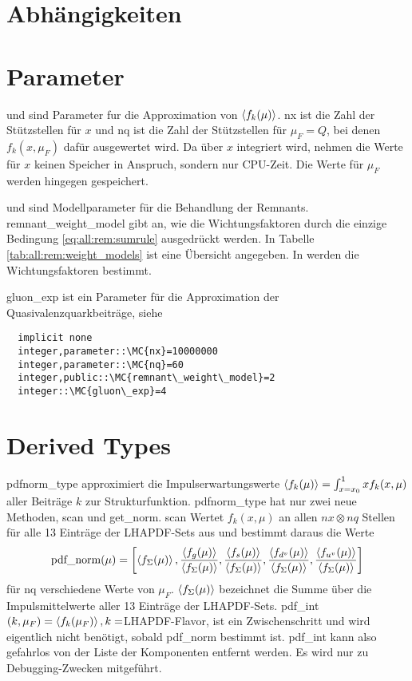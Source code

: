 \section{Abhängigkeiten}

\section{Parameter}
 und  sind Parameter fur die Approximation von $\left<f_k(\mu)\right>$. nx ist die Zahl der Stützstellen für $x$ und nq ist die Zahl der Stützstellen für $\mu_F=Q$, bei denen $f_k(x,\mu_F)$ dafür ausgewertet wird. Da über $x$ integriert wird, nehmen die Werte für $x$ keinen Speicher in Anspruch, sondern nur CPU-Zeit. Die Werte für $\mu_F$ werden hingegen gespeichert.

 und  sind Modellparameter für die Behandlung der Remnants. remnant\_weight\_model gibt an, wie die Wichtungsfaktoren durch die einzige Bedingung \eqref{eq:all:rem:sumrule} ausgedrückt werden. In Tabelle \ref{tab:all:rem:weight_models} ist eine Übersicht angegeben. In  werden die Wichtungsfaktoren bestimmt.

gluon\_exp ist ein Parameter für die Approximation der Quasivalenzquarkbeiträge, siehe 
\begin{Verbatim}
  implicit none
  integer,parameter::\MC{nx}=10000000
  integer,parameter::\MC{nq}=60
  integer,public::\MC{remnant\_weight\_model}=2
  integer::\MC{gluon\_exp}=4
\end{Verbatim}

\section{Derived Types}
pdfnorm\_type approximiert die Impulserwartungswerte $\left<f_k(\mu)\right>=\int_{x=x_0}^{1}xf_k(x,\mu)$ aller Beiträge $k$ zur Strukturfunktion. pdfnorm\_type hat nur zwei neue Methoden, scan und get\_norm. scan Wertet $f_k(x,\mu)$ an allen $nx\otimes nq$ Stellen für alle 13 Einträge der LHAPDF-Sets aus und bestimmt daraus die Werte
\begin{equation}
  \text{pdf\_norm}(\mu)=\left[\left<f_\Sigma(\mu)\right>,\frac{\left<f_g(\mu)\right>}{\left<f_\Sigma(\mu)\right>},\frac{\left<f_{s}(\mu)\right>}{\left<f_\Sigma(\mu)\right>},\frac{\left<f_{d^v}(\mu)\right>}{\left<f_\Sigma(\mu)\right>},\frac{\left<f_{u^v}(\mu)\right>}{\left<f_\Sigma(\mu)\right>}\right]
\end{equation}
für nq verschiedene Werte von $\mu_F$. $\left<f_\Sigma(\mu)\right>$ bezeichnet die Summe über die Impulsmittelwerte aller 13 Einträge der LHAPDF-Sets. pdf\_int$(k,\mu_F)=\left<f_k(\mu_F)\right>, k=$LHAPDF-Flavor, ist ein Zwischenschritt und wird eigentlich nicht benötigt, sobald pdf\_norm bestimmt ist. pdf\_int kann also gefahrlos von der Liste der Komponenten entfernt werden. Es wird nur zu Debugging-Zwecken mitgeführt.

